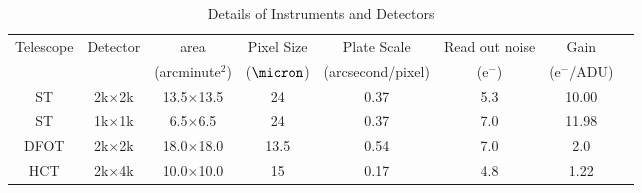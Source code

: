\begin{table*}
\caption{ Details of Instruments and Detectors }
\centering
\smallskip
\begin{tabular}{c c c c c c c c}
\hline \hline
Telescope & Detector      & area              & Pixel Size     & Plate Scale      & Read out noise & Gain        \\
          &               & (arcminute$^2$)   & ($\micron$)    &(arcsecond/pixel) & (e$^-$)        & (e$^-$/ADU) \\
\hline
ST        & 2k$\times$2k  & 13.5$\times$13.5  & 24             & 0.37               &5.3             &10.00       \\
ST        & 1k$\times$1k  & 6.5$\times$6.5   & 24             & 0.37               &7.0             &11.98       \\
DFOT      & 2k$\times$2k  & 18.0$\times$18.0  & 13.5           & 0.54               &7.0             &2.0          \\
HCT       & 2k$\times$4k  & 10.0$\times$10.0  & 15             & 0.17               &4.8             &1.22         \\
\hline                                   
\end{tabular}
\label{tab:details_instrument_detectors}      
\end{table*}
